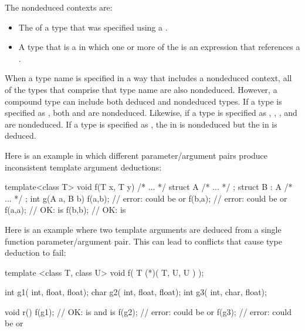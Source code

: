 \pnum
The nondeduced contexts are:

%
\begin{itemize}
\item
The
of a type that was specified using a
.
\item
A type that is a  in which one or more of the
 is an expression that references a
.
\end{itemize}

When a type name is specified in a way that includes a nondeduced
context, all of the types that comprise that type name are also
nondeduced.
However, a compound type can include both deduced and nondeduced types.
\enterexample
If a type is specified as
,
both
and
are nondeduced.
Likewise, if a type is specified as
,
,
,
and
are nondeduced.
If a type is specified as
,
the
in
is nondeduced but
the
in
is deduced.
\exitexample

\pnum
\enterexample
Here is an example in which different parameter/argument pairs produce
inconsistent template argument deductions:

\begin{codeblock}
template<class T> void f(T x, T y) { /* ... */ }
struct A { /* ... */ };
struct B : A { /* ... */ };
int g(A a, B b)
{
	f(a,b);			// error:  could be  or 
	f(b,a);			// error:  could be  or 
	f(a,a);			// OK:  is 
	f(b,b);			// OK:  is 
}
\end{codeblock}

\pnum
Here is an example where two template arguments are deduced from a
single function parameter/argument pair.
This can lead to conflicts
that cause type deduction to fail:

\begin{codeblock}
template <class T, class U> void f(  T (*)( T, U, U )  );

int g1( int, float, float);
char g2( int, float, float);
int g3( int, char, float);

void r()
{
	f(g1);			// OK:  is  and  is 
	f(g2);			// error:  could be  or 
	f(g3);			// error:  could be  or 
}
\end{codeblock}


